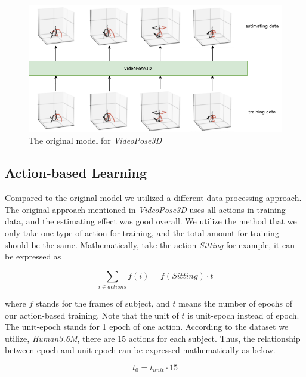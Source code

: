 \documentclass[10pt,twocolumn,letterpaper]{article}
\begin{document}
\begin{figure}[H]
	\begin{center}
  		\includegraphics[width=0.9\linewidth]{model.png}
	\end{center}
   	\caption{The original model for \textit{VideoPose3D}}
	\label{fig:long}
	\label{fig:onecol}
\end{figure}

\subsection{Action-based Learning}

Compared to the original model we utilized a different data-processing approach. The original approach
mentioned in \textit{VideoPose3D} uses all actions in training data, and the estimating effect was good
overall. We utilize the method that we only take one type of action for training, and the total amount 
for training should be the same. Mathematically, take the action \textit{Sitting} for example, it can 
be expressed as

\begin{equation}
	\sum_{i\in actions}{f(i)} = f(Sitting)\cdot t
\end{equation}

where $f$ stands for the frames of subject, and $t$ means the number of epochs of our action-based 
training. Note that the unit of $t$ is unit-epoch instead of epoch. The unit-epoch stands for 1 epoch
of one action. According to the dataset we utilize, \textit{Human3.6M}, there are 15 actions for each
subject. Thus, the relationship between epoch and unit-epoch can be expressed mathematically as below.

\begin{equation}
	t_0 = t_{unit}\cdot 15
\end{equation}
\end{document}
